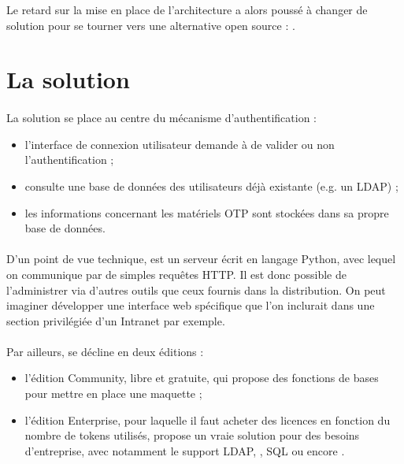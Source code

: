Le retard sur la mise en place de l'architecture a alors poussé \asmile{} à changer de solution pour se tourner vers une alternative open source : \alinotp{}.


\section{La solution \alinotp{}}

\paragraph{}
La solution \alinotp{} se place au centre du mécanisme d'authentification :

\begin{itemize}
	\item l'interface de connexion utilisateur demande à \alinotp{} de valider ou non l'authentification ;
	\item \alinotp{} consulte une base de données des utilisateurs déjà existante (e.g. un LDAP) ;
	\item les informations concernant les matériels OTP sont stockées dans sa propre base de données.
\end{itemize}

\paragraph{}
D'un point de vue technique, \alinotp{} est un serveur écrit en langage Python, avec lequel on communique par de simples requêtes HTTP.
Il est donc possible de l'administrer via d'autres outils que ceux fournis dans la distribution.
On peut imaginer développer une interface web spécifique que l'on inclurait dans une section privilégiée d'un Intranet par exemple.

\paragraph{}
Par ailleurs, \alinotp{} se décline en deux éditions :

\begin{itemize}
	\item l'édition Community, libre et gratuite, qui propose des fonctions de bases pour mettre en place une maquette ;
	\item l'édition Enterprise, pour laquelle il faut acheter des licences en fonction du nombre de tokens utilisés, propose un vraie solution pour des besoins d'entreprise, avec notamment le support LDAP, \aad{}, SQL ou encore \afreerad{}.
\end{itemize}


